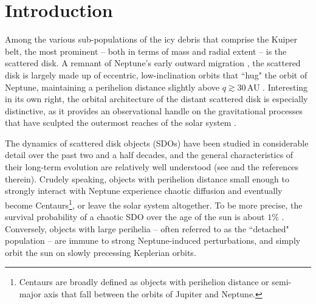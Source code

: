 \documentclass[twocolumn]{aastex62}
\begin{document}
                              

\section{Introduction} \label{sec:intro}

Among the various sub-populations of the icy debris that comprise the Kuiper belt, the most prominent -- both in terms of mass and radial extent -- is the scattered disk. A remnant of Neptune's early outward migration \citep{Nesvorny2018REV}, the scattered disk is largely made up of eccentric, low-inclination orbits that ``hug" the orbit of Neptune, maintaining a perihelion distance slightly above $q\gtrsim30\,$AU \citep{2020tnss.book...25M}. Interesting in its own right, the orbital architecture of the distant scattered disk is especially distinctive, as it provides an observational handle on the gravitational processes that have sculpted the outermost reaches of the solar system \citep{2004ApJ...617..645B, 2010ARA&A..48...47A, 2019PhR...805....1B, 2021arXiv210501065C}.

The dynamics of scattered disk objects (SDOs) have been studied in considerable detail over the past two and a half decades, and the general characteristics of their long-term evolution are relatively well understood (see \citealt{Saillenfest2020} and the references therein). Crudely speaking, objects with perihelion distance small enough to strongly interact with Neptune experience chaotic diffusion and eventually become Centaurs\footnote{Centaurs are broadly defined as objects with perihelion distance or semi-major axis that fall between the orbits of Jupiter and Neptune.}, or leave the solar system altogether. To be more precise, the survival probability of a chaotic SDO over the age of the sun is about $1\%$ \citep{Gomes2008}. Conversely, objects with large perihelia -- often referred to as the ``detached" population -- are immune to strong Neptune-induced perturbations, and simply orbit the sun on slowly precessing Keplerian orbits.
\end{document}

